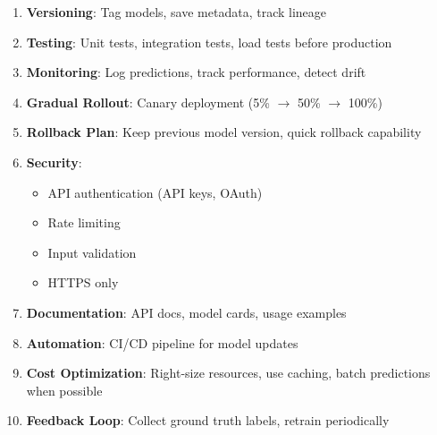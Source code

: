 \documentclass[11pt,twoside]{article}
\numberwithin{equation}{section}
\theoremstyle{plain}
\theoremstyle{definition}
\theoremstyle{remark}
\begin{document}
\begin{tcolorbox}[colback=yellow!10!white,colframe=orange!75!black,title=Deployment Best Practices]
\begin{enumerate}
\item \textbf{Versioning}: Tag models, save metadata, track lineage

\item \textbf{Testing}: Unit tests, integration tests, load tests before production

\item \textbf{Monitoring}: Log predictions, track performance, detect drift

\item \textbf{Gradual Rollout}: Canary deployment (5\% $\to$ 50\% $\to$ 100\%)

\item \textbf{Rollback Plan}: Keep previous model version, quick rollback capability

\item \textbf{Security}:
\begin{itemize}
\item API authentication (API keys, OAuth)
\item Rate limiting
\item Input validation
\item HTTPS only
\end{itemize}

\item \textbf{Documentation}: API docs, model cards, usage examples

\item \textbf{Automation}: CI/CD pipeline for model updates

\item \textbf{Cost Optimization}: Right-size resources, use caching, batch predictions when possible

\item \textbf{Feedback Loop}: Collect ground truth labels, retrain periodically
\end{enumerate}
\end{tcolorbox}
\end{document}
